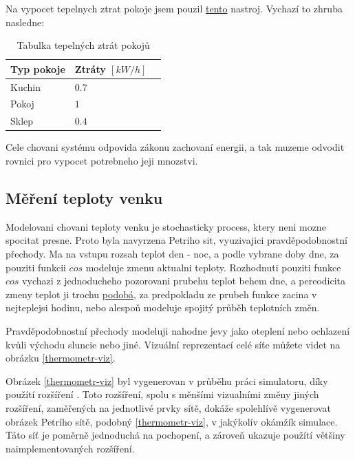 Na vypocet tepelnych ztrat pokoje jsem pouzil \href{https://wpcalc.com/kalkulyator-teplopoter/}{tento} nastroj.
Vychazí to zhruba nasledne:

\begin{table}[H]
	\vskip6pt
	\caption{Tabulka tepelných ztrát pokojů}
    \vskip6pt
	\centering
	\begin{tabular}{llr}
		\toprule
		Typ pokoje & Ztráty $[kW/h]$ \\
		\midrule
		Kuchin & $0.7$ \\
    Pokoj & $1$ \\
    Sklep & $0.4$ \\
		\bottomrule
	\end{tabular}
	\label{tab:TepelneZtraty}
\end{table}

Cele chovani systému odpovida zákonu zachovaní energii, a tak muzeme odvodit rovnici pro vypocet potrebneho jeji mnozstvi.

\subsection{Měření teploty venku}
\label{subsec:mereni-teploty}
Modelovani chovani teploty venku je stochasticky process, ktery neni mozne spocitat presne. Proto byla navyrzena Petriho sit, vyuzivajici pravděpodobnostní přechody. Ma na vstupu rozsah teplot den - noc, a podle vybrane doby dne, za pouziti funkcii $cos$ modeluje zmenu aktualni teploty. Rozhodnuti pouziti funkce $cos$ vychazi z jednoducheho pozorovani prubehu teplot behem dne, a pereodicita zmeny teplot ji trochu \href{https://forecast.weather.gov/MapClick.php?lat=42.3758&lon=-71.1187&lg=english&FcstType=graphical}{podobá}, za predpokladu ze prubeh funkce zacina v nejteplejsi hodinu, nebo alespoň modeluje spojitý průběh teplotních změn.

Pravděpodobnostní přechody modeluji nahodne jevy jako oteplení nebo ochlazení kvůli východu sluncie nebo jiné. Vizuální reprezentací celé síťe můžete videt na obrázku \ref{thermometr-viz}.

Obrázek \ref{thermometr-viz} byl vygenerovan v průběhu práci simulatoru, díky použítí rozšíření \href{https://www.ibisc.univ-evry.fr/~fpommereau/SNAKES/API/plugins/gv.html}{}. Toto rozšíření, spolu s měnšími vizualními změny jiných rozšíření, zaměřených na jednotlivé prvky sítě, dokáže spolehlívě vygenerovat obrázek Petrího sítě, podobný \ref{thermometr-viz}, v jakýkolív okámžík simulace. Táto síť je poměrně jednoduchá na pochopení, a zároveň ukazuje použítí většiny naimplementovaných rozšíření.

